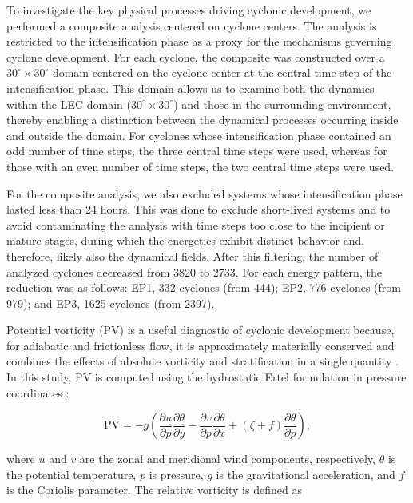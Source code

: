 \documentclass[pdflatex,sn-chicago]{sn-jnl}%
\theoremstyle{plain}
\theoremstyle{definition}
\theoremstyle{remark}
\theoremstyle{definition}
\begin{document}
To investigate the key physical processes driving cyclonic development, we performed a composite analysis centered on cyclone centers. The analysis is restricted to the intensification phase as a proxy for the mechanisms governing cyclone development. For each cyclone, the composite was constructed over a $30^{\circ} \times 30^{\circ}$ domain centered on the cyclone center at the central time step of the intensification phase. This domain allows us to examine both the dynamics within the LEC domain ($30^{\circ} \times 30^{\circ}$) and those in the surrounding environment, thereby enabling a distinction between the dynamical processes occurring inside and outside the domain. For cyclones whose intensification phase contained an odd number of time steps, the three central time steps were used, whereas for those with an even number of time steps, the two central time steps were used.

For the composite analysis, we also excluded systems whose intensification phase lasted less than 24 hours. This was done to exclude short-lived systems and to avoid contaminating the analysis with time steps too close to the incipient or mature stages, during which the energetics exhibit distinct behavior \citep{de2025lorenz} and, therefore, likely also the dynamical fields. After this filtering, the number of analyzed cyclones decreased from 3820 to 2733. For each energy pattern, the reduction was as follows: EP1, 332 cyclones (from 444); EP2, 776 cyclones (from 979); and EP3, 1625 cyclones (from 2397).


Potential vorticity (PV) is a useful diagnostic of cyclonic development because, for adiabatic and frictionless flow, it is approximately materially conserved and combines the effects of absolute vorticity and stratification in a single quantity \citep{hoskins1985use}. In this study, PV is computed using the hydrostatic Ertel formulation in pressure coordinates \citep{bluestein1993observations}:

\begin{equation}
\mathrm{PV}
=
-g\left(
\frac{\partial u}{\partial p}\frac{\partial \theta}{\partial y}
-
\frac{\partial v}{\partial p}\frac{\partial \theta}{\partial x}
+
(\zeta + f)\frac{\partial \theta}{\partial p}
\right),
\end{equation}

where \(u\) and \(v\) are the zonal and meridional wind components, respectively, \(\theta\) is the potential temperature, \(p\) is pressure, \(g\) is the gravitational acceleration, and \(f\) is the Coriolis parameter. The relative vorticity is defined as
\end{document}
